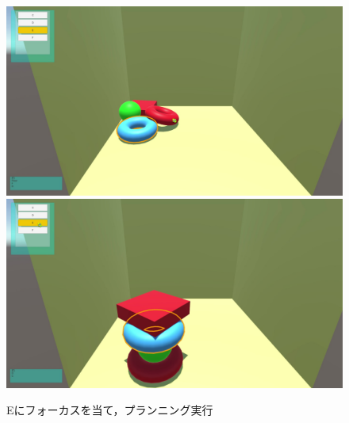 \documentclass[12pt]{jarticle}
\begin{document}
\begin{figure}[!hbt]
  	\begin{center}
  		\includegraphics[scale=0.2]{images/BWP_Work6/bwp8.jpg}
  		\includegraphics[scale=0.2]{images/BWP_Work6/bwp9.jpg}
	\end{center}
  	\caption{Eにフォーカスを当て，プランニング実行}
  	\label{fig:run6}
\end{figure}
\end{document}
